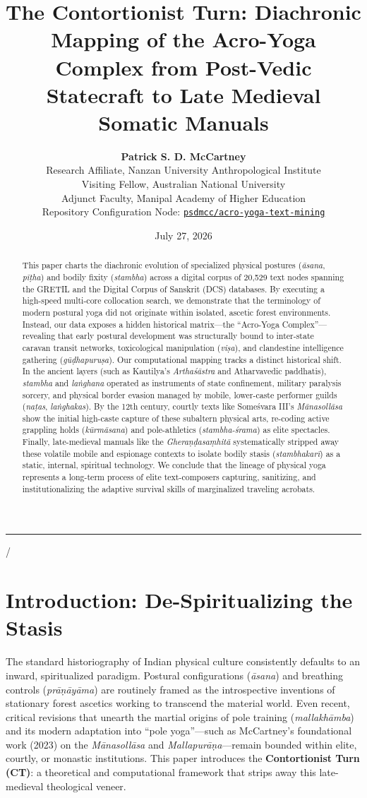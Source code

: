 \documentclass[11pt,letterpaper]{article}
\title{\textbf{The Contortionist Turn: Diachronic Mapping of the Acro-Yoga Complex from Post-Vedic Statecraft to Late Medieval Somatic Manuals}}
\author{\textbf{Patrick S. D. McCartney} \\ 
\small Research Affiliate, Nanzan University Anthropological Institute \\
\small Visiting Fellow, Australian National University \\
\small Adjunct Faculty, Manipal Academy of Higher Education \\
\small Repository Configuration Node: \href{https://github.com}{\texttt{psdmcc/acro-yoga-text-mining}}}
\date{\small July 27, 2026}
\begin{document}
\maketitle

\begin{abstract}
This paper charts the diachronic evolution of specialized physical postures (\textit{āsana}, \textit{pīṭha}) and bodily fixity (\textit{stambha}) across a digital corpus of 20,529 text nodes spanning the GRETIL and the Digital Corpus of Sanskrit (DCS) databases. By executing a high-speed multi-core collocation search, we demonstrate that the terminology of modern postural yoga did not originate within isolated, ascetic forest environments. Instead, our data exposes a hidden historical matrix---the ``Acro-Yoga Complex''---revealing that early postural development was structurally bound to inter-state caravan transit networks, toxicological manipulation (\textit{viṣa}), and clandestine intelligence gathering (\textit{gūḍhapuruṣa}). Our computational mapping tracks a distinct historical shift. In the ancient layers (such as Kautilya's \textit{Arthaśāstra} and Atharvavedic paddhatis), \textit{stambha} and \textit{laṅghana} operated as instruments of state confinement, military paralysis sorcery, and physical border evasion managed by mobile, lower-caste performer guilds (\textit{naṭas}, \textit{laṅghakas}). By the 12th century, courtly texts like Someśvara III's \textit{Mānasollāsa} show the initial high-caste capture of these subaltern physical arts, re-coding active grappling holds (\textit{kūrmāsana}) and pole-athletics (\textit{stambha-śrama}) as elite spectacles. Finally, late-medieval manuals like the \textit{Gheraṇḍasaṃhitā} systematically stripped away these volatile mobile and espionage contexts to isolate bodily stasis (\textit{stambhakarī}) as a static, internal, spiritual technology. We conclude that the lineage of physical yoga represents a long-term process of elite text-composers capturing, sanitizing, and institutionalizing the adaptive survival skills of marginalized traveling acrobats.
\end{abstract}

\noindent\rule{\textwidth}{0.4pt}

/\section{Introduction: De-Spiritualizing the Stasis}
The standard historiography of Indian physical culture consistently defaults to an inward, spiritualized paradigm. Postural configurations (\textit{āsana}) and breathing controls (\textit{prāṇāyāma}) are routinely framed as the introspective inventions of stationary forest ascetics working to transcend the material world. Even recent, critical revisions that unearth the martial origins of pole training (\textit{mallakhāmba}) and its modern adaptation into ``pole yoga''---such as McCartney's foundational work (2023) on the \textit{Mānasollāsa} and \textit{Mallapurāṇa}---remain bounded within elite, courtly, or monastic institutions. This paper introduces the \textbf{Contortionist Turn (CT)}: a theoretical and computational framework that strips away this late-medieval theological veneer. 
\end{document}
